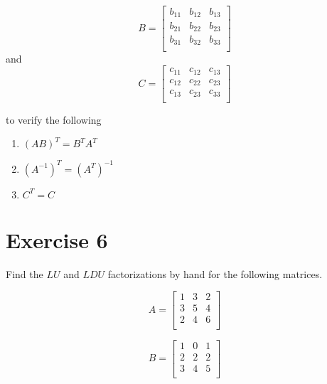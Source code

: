 \documentclass[12pt]{article}
\begin{document}
\begin{equation}
    B   = 
    \begin{bmatrix}
        b_{11}  &   b_{12}  &   b_{13}  \\
        b_{21}  &   b_{22}  &   b_{23}  \\
        b_{31}  &   b_{32}  &   b_{33}  \\
    \end{bmatrix}
\end{equation}
and 
\begin{equation}
    C   = 
    \begin{bmatrix}
        c_{11}  &   c_{12}  &   c_{13}  \\
        c_{12}  &   c_{22}  &   c_{23}  \\
        c_{13}  &   c_{23}  &   c_{33}  \\
    \end{bmatrix}
\end{equation}

to verify the following
\begin{enumerate}[label=(\alph*)]
    \item $\left(AB\right)^{T} = B^{T} A^{T}$ 
    \item $\left(A^{-1}\right)^{T} = \left(A^{T}\right)^{-1}$  
    \item $C^{T} = C$
\end{enumerate}

\section{Exercise 6}
Find the $LU$ and $LDU$ factorizations by hand for the following matrices.

\begin{equation}
    A = 
    \begin{bmatrix}
        1       &       3       &   2   \\
        3       &       5       &   4   \\
        2       &       4       &   6   \\
    \end{bmatrix}
\end{equation}

\begin{equation}
    B = 
    \begin{bmatrix}
        1       &       0       &   1   \\
        2       &       2       &   2   \\
        3       &       4       &   5   \\
    \end{bmatrix}
\end{equation}
\end{document}
